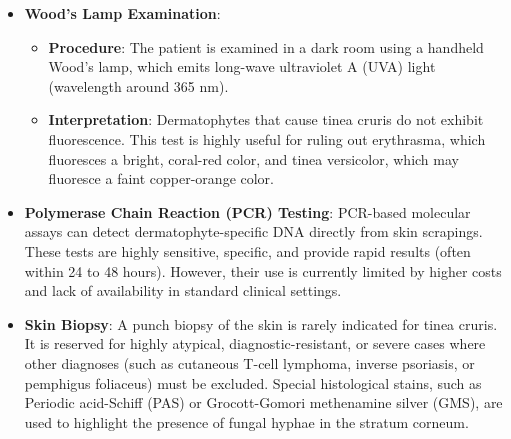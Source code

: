 \begin{itemize}
\begin{itemize}
        \item \textbf{Procedure}: Skin scrapings are inoculated onto a specialized growth medium, typically Sabouraud's dextrose agar, which may contain antibiotics (like chloramphenicol) to inhibit bacterial growth and cycloheximide to suppress non-pathogenic molds.
        \item \textbf{Interpretation}: The cultures are incubated at room temperature for 2 to 4 weeks. Fungal species are identified by their characteristic colony morphology (color, texture, growth rate) and microscopic appearance (microconidia and macroconidia). Common isolates include \textit{T. rubrum} and \textit{E. floccosum}.
    \end{itemize}
    \item \textbf{Wood's Lamp Examination}:
    \begin{itemize}
        \item \textbf{Procedure}: The patient is examined in a dark room using a handheld Wood's lamp, which emits long-wave ultraviolet A (UVA) light (wavelength around 365 nm).
        \item \textbf{Interpretation}: Dermatophytes that cause tinea cruris do not exhibit fluorescence. This test is highly useful for ruling out erythrasma, which fluoresces a bright, coral-red color, and tinea versicolor, which may fluoresce a faint copper-orange color.
    \end{itemize}
    \item \textbf{Polymerase Chain Reaction (PCR) Testing}: PCR-based molecular assays can detect dermatophyte-specific DNA directly from skin scrapings. These tests are highly sensitive, specific, and provide rapid results (often within 24 to 48 hours). However, their use is currently limited by higher costs and lack of availability in standard clinical settings.
    \item \textbf{Skin Biopsy}: A punch biopsy of the skin is rarely indicated for tinea cruris. It is reserved for highly atypical, diagnostic-resistant, or severe cases where other diagnoses (such as cutaneous T-cell lymphoma, inverse psoriasis, or pemphigus foliaceus) must be excluded. Special histological stains, such as Periodic acid-Schiff (PAS) or Grocott-Gomori methenamine silver (GMS), are used to highlight the presence of fungal hyphae in the stratum corneum.
\end{itemize}

